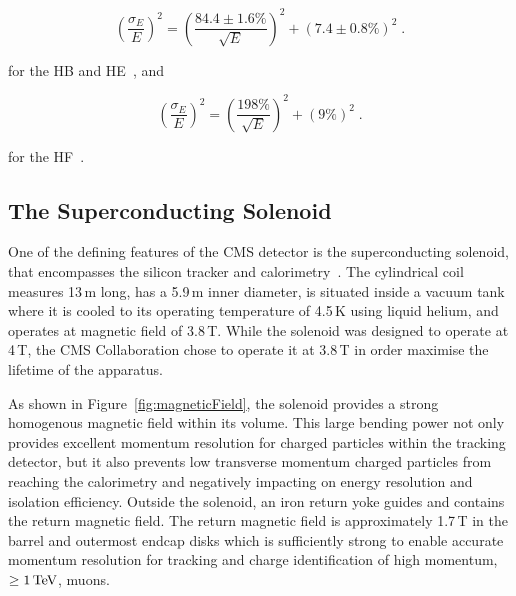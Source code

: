 \begin{equation}
(\frac{\sigma_{E}}{E})^{2} = (\frac{84.4 \pm 1.6\%}{\sqrt{E}})^{2} + (7.4 \pm 0.8\%)^{2} \;.
\label{eq:hcalResolution}
\end{equation}

for the HB and HE~\cite{Abdullin:2008zzb}, and

\begin{equation}
(\frac{\sigma_{E}}{E})^{2} = (\frac{198\%}{\sqrt{E}})^{2} + (9\%)^{2} \;.
\label{eq:hfResolution}
\end{equation}

for the HF~\cite{Bayatian:2006jz}.

\subsection{The Superconducting Solenoid}\label{subsec:magnet}
One of the defining features of the CMS detector is the superconducting solenoid, that encompasses the silicon tracker and calorimetry~\cite{Acquistapace:1997fm,Herve:2000}.
The cylindrical coil measures 13\,m long, has a 5.9\,m inner diameter, is situated inside a vacuum tank where it is cooled to its operating temperature of 4.5\,K using liquid helium, and operates at magnetic field of 3.8\,T.
While the solenoid was designed to operate at 4\,T, the CMS Collaboration chose to operate it at 3.8\,T in order maximise the lifetime of the apparatus.

As shown in Figure~\ref{fig:magneticField}, the solenoid provides a strong homogenous magnetic field within its volume.
This large bending power not only provides excellent momentum resolution for charged particles within the tracking detector, but it also prevents low transverse momentum charged particles from reaching the calorimetry and negatively impacting on energy resolution and isolation efficiency.
Outside the solenoid, an iron return yoke guides and contains the return magnetic field.
The return magnetic field is approximately 1.7\,T in the barrel and outermost endcap disks which is sufficiently strong to enable accurate momentum resolution for tracking and charge identification of high momentum, \ie $\geq 1\,\text{Te\hspace{-.08em}V}$, muons.

